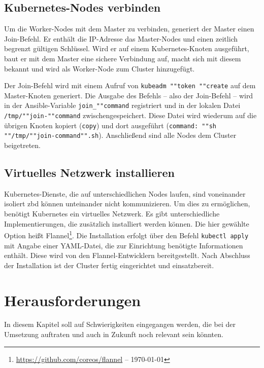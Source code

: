 \subsection{Kubernetes-Nodes verbinden}\label{subsec:kubernetes-nodes-verbinden}

Um die Worker-Nodes mit dem Master zu verbinden, generiert der Master einen Join-Befehl.
Er enthält die IP-Adresse das Master-Nodes und einen zeitlich begrenzt gültigen Schlüssel.
Wird er auf einem Kubernetes-Knoten ausgeführt, baut er mit dem Master eine sichere Verbindung auf, macht sich mit diesem bekannt und wird als Worker-Node zum Cluster hinzugefügt.

Der Join-Befehl wird mit einem Aufruf von \texttt{kubeadm ""token ""create} auf dem Master-Knoten generiert.
Die Ausgabe des Befehls -- also der Join-Befehl -- wird in der Ansible-Variable \texttt{join\_""command} registriert und in der lokalen Datei \texttt{/tmp/""join-""command} zwischengespeichert.
Diese Datei wird wiederum auf die übrigen Knoten kopiert (\texttt{copy}) und dort ausgeführt (\texttt{command: ""sh ""/tmp/""join-command"".sh}).
Anschließend sind alle Nodes dem Cluster beigetreten.

\subsection{Virtuelles Netzwerk installieren}

Kubernetes-Dienste, die auf unterschiedlichen Nodes laufen, sind voneinander isoliert zbd können unteinander nicht kommunizieren.
Um dies zu ermöglichen, benötigt Kubernetes ein virtuelles Netzwerk.
Es gibt unterschiedliche Implementierungen, die zusätzlich installiert werden können.
Die hier gewählte Option heißt Flannel\footnote{\url{https://github.com/coreos/flannel} -- \today}.
Die Installation erfolgt über den Befehl \texttt{kubectl apply} mit Angabe einer YAML-Datei, die zur Einrichtung benötigte Informationen enthält.
Diese wird von den Flannel-Entwicklern bereitgestellt.
Nach Abschluss der Installation ist der Cluster fertig eingerichtet und einsatzbereit.

\section{Herausforderungen}

In diesem Kapitel soll auf Schwierigkeiten eingegangen werden, die bei der Umsetzung auftraten und auch in Zukunft noch relevant sein könnten.

